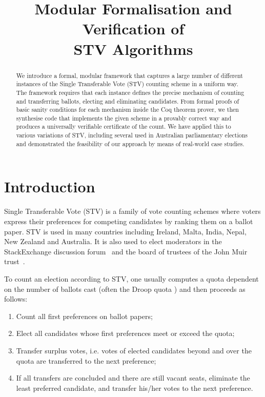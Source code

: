 \documentclass{llncs}
\title{Modular Formalisation and Verification of \\STV Algorithms}
\author{}
\institute{The Australian National University}
\begin{document}
\maketitle
\pagestyle{plain}
\thispagestyle{empty}
\begin{abstract}
We introduce a formal, modular framework that captures a large number of
different instances of the Single Transferable Vote (STV) counting
scheme in a uniform way. The framework requires that each instance
defines the precise mechanism of counting and transferring ballots,
electing and eliminating candidates. From formal proofs of basic
sanity conditions for each mechanism inside the Coq theorem prover, we then synthesise
code that implements the given scheme in a provably correct way and
produces a universally verifiable certificate of the count. We have
applied this to various variations of STV, including several  used in Australian
parliamentary elections and demonstrated the feasibility of our
approach by means of real-world case studies.
\end{abstract}

\section{Introduction}
 Single Transferable Vote (STV) is a family of 
 vote counting schemes where voters express their 
 preferences for competing candidates by ranking them on a ballot
 paper. STV is used
in many 
 countries including Ireland, Malta, India, Nepal, New Zealand and
 Australia. It is also used to elect moderators in the
 StackExchange discussion forum~\cite{StackExchange:2018:ME} and the
 board of trustees of the John Muir trust~\cite{Trust:2018:AT}. 

 To count an election according to STV, one usually computes a quota
 dependent on the number of ballots cast (often the Droop quota
 \cite{Droop:1881:MER}) and then proceeds as follows:
 \begin{enumerate}
 \item Count all first preferences on ballot papers;
 \item Elect all candidates whose first preferences meet or exceed the
 quota;
 \item Transfer surplus votes, i.e. votes of elected candidates beyond and
 over the quota are transferred to the next preference;
 \item If all transfers are concluded and there are still vacant
 seats, eliminate the least preferred candidate, and transfer his/her  votes
 to the next preference.
 \end{enumerate}
\end{document}

